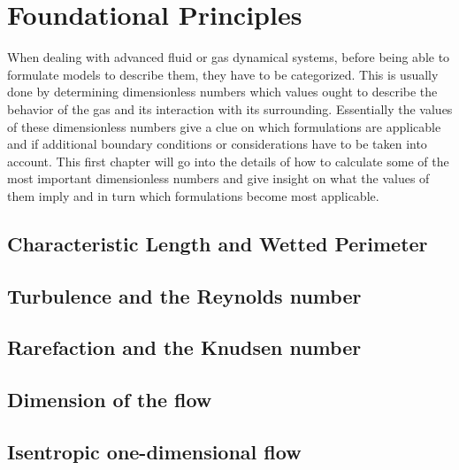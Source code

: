 
\section{Foundational Principles}
	When dealing with advanced fluid or gas dynamical systems, before being able to formulate models to describe them, they have to be categorized.
	This is usually done by determining dimensionless numbers which values ought to describe the behavior of the gas and its interaction with its surrounding.
	Essentially the values of these dimensionless numbers give a clue on which formulations are applicable and if additional boundary conditions or considerations have to be taken into account.
	This first chapter will go into the details of how to calculate some of the most important dimensionless numbers and give insight on what the values of them imply and in turn which formulations become most applicable.

\subsection{Characteristic Length and Wetted Perimeter}


\subsection{Turbulence and the Reynolds number}


\subsection{Rarefaction and the Knudsen number}


\subsection{Dimension of the flow}\label{sec:flow-dimension-foundations}


\subsection{Isentropic one-dimensional flow}\label{sec:isentropic-1D-foundations}


